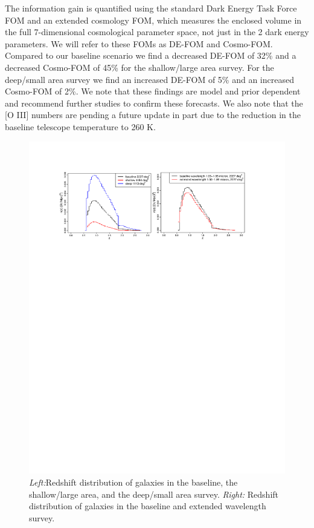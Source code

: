 The information gain is quantified using the standard Dark Energy Task Force FOM and an extended cosmology FOM, which measures the enclosed volume in the full 7-dimensional cosmological parameter space, not just in the 2 dark energy parameters. We will refer to these FOMs as DE-FOM and Cosmo-FOM. Compared to our baseline scenario we find a decreased DE-FOM of 32\% and a decreased Cosmo-FOM of 45\% for the shallow/large area survey. For the deep/small area survey we find an increased DE-FOM of 5\% and an increased Cosmo-FOM of 2\%. We note that these findings are model and prior dependent and recommend further studies to confirm these forecasts. We also note that the [O III] numbers are pending a future update in part due to the reduction in the baseline telescope temperature to 260 K.
\begin{figure}
  \includegraphics[width=16.0cm]{Plots/forecasts/HLSS_forecasts.pdf}
    \caption{\textit{Left:}Redshift distribution of galaxies in the baseline, the shallow/large area, and the deep/small area survey. \textit{Right:} Redshift distribution of galaxies in the baseline and extended wavelength survey.
}
  \label{fi:forecast1}
\end{figure}


